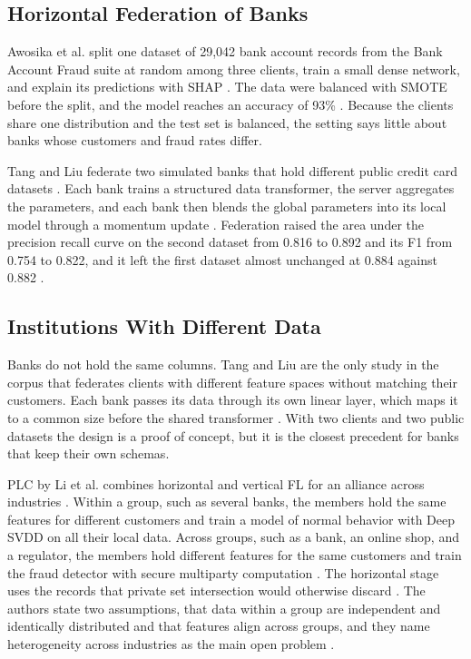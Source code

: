 \documentclass[journal]{IEEEtran}
\begin{document}
\subsection{Horizontal Federation of Banks}

Awosika et al. split one dataset of 29{,}042 bank account records from the Bank Account Fraud suite \cite{jesus2022baf} at random among three clients, train a small dense network, and explain its predictions with SHAP \cite{awosika2024xai}. The data were balanced with SMOTE before the split, and the model reaches an accuracy of 93\% \cite{awosika2024xai}. Because the clients share one distribution and the test set is balanced, the setting says little about banks whose customers and fraud rates differ.

Tang and Liu federate two simulated banks that hold different public credit card datasets \cite{tang2024sdt}. Each bank trains a structured data transformer, the server aggregates the parameters, and each bank then blends the global parameters into its local model through a momentum update \cite{tang2024sdt}. Federation raised the area under the precision recall curve on the second dataset from 0.816 to 0.892 and its F1 from 0.754 to 0.822, and it left the first dataset almost unchanged at 0.884 against 0.882 \cite{tang2024sdt}.

\subsection{Institutions With Different Data}

Banks do not hold the same columns. Tang and Liu are the only study in the corpus that federates clients with different feature spaces without matching their customers. Each bank passes its data through its own linear layer, which maps it to a common size before the shared transformer \cite{tang2024sdt}. With two clients and two public datasets the design is a proof of concept, but it is the closest precedent for banks that keep their own schemas.

PLC by Li et al. combines horizontal and vertical FL for an alliance across industries \cite{li2026plc}. Within a group, such as several banks, the members hold the same features for different customers and train a model of normal behavior with Deep SVDD on all their local data. Across groups, such as a bank, an online shop, and a regulator, the members hold different features for the same customers and train the fraud detector with secure multiparty computation \cite{li2026plc}. The horizontal stage uses the records that private set intersection would otherwise discard \cite{li2026plc}. The authors state two assumptions, that data within a group are independent and identically distributed and that features align across groups, and they name heterogeneity across industries as the main open problem \cite{li2026plc}.
\end{document}
